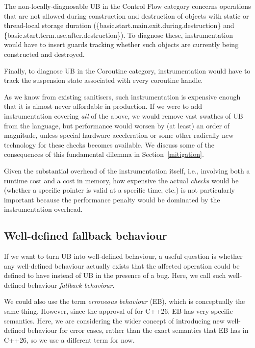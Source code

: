 The non-locally-diagnosable UB in the Control Flow category concerns operations that are not allowed during construction and destruction of objects with static or thread-local storage duration (\{basic.start.main.exit.during.destruction\} and \{basic.start.term.use.after.destruction\}). To diagnose these, instrumentation would have to insert guards tracking whether such objects are currently being constructed and destroyed.  

Finally, to diagnose UB in the Coroutine category, instrumentation would have to track the suspension state associated with every coroutine handle.

As we know from existing sanitisers, such instrumentation is expensive enough that it is almost never affordable in production. If we were to add instrumentation covering \emph{all} of the above, we would remove vast swathes of UB from the language, but performance would worsen by (at least) an order of magnitude, unless special hardware-acceleration or some other radically new technology for these checks becomes available. We discuss some of the consequences of this fundamental dilemma in Section~\ref{mitigation}.

Given the substantial overhead of the instrumentation itself, i.e., involving both a runtime cost and a cost in memory, how expensive the actual \emph{checks} would be (whether a specific pointer is valid at a specific time, etc.) is not particularly important because the performance penalty would be dominated by the instrumentation overhead.

\subsection{Well-defined fallback behaviour}
\label{fallback}

If we want to turn UB into well-defined behaviour, a useful question is whether any well-defined behaviour actually exists that the affected operation could be defined to have instead of UB in the presence of a bug. Here, we call such well-defined behaviour \emph{fallback behaviour}.

We could also use the term \emph{erroneous behaviour} (EB), which is conceptually the same thing. However, since the approval of \cite{P2795R5} for C++26, EB has very specific semantics. Here, we are considering the wider concept of introducing new well-defined behaviour for error cases, rather than the exact semantics that EB has in C++26, so we use a different term for now.

